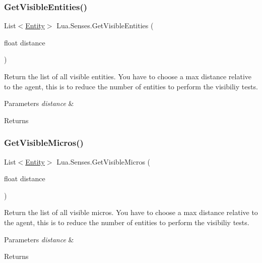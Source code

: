 \subsubsection{\texorpdfstring{GetVisibleEntities()}{GetVisibleEntities()}}
{\footnotesize\ttfamily List$<$\mbox{\hyperlink{class_lua_1_1_entity}{Entity}}$>$ Lua.\+Senses.\+Get\+Visible\+Entities (\begin{DoxyParamCaption}\item[{float}]{distance }\end{DoxyParamCaption})}



Return the list of all visible entities. You have to choose a max distance relative to the agent, this is to reduce the number of entities to perform the visibiliy tests. 


\begin{DoxyParams}{Parameters}
{\em distance} & \\
\hline
\end{DoxyParams}
\begin{DoxyReturn}{Returns}

\end{DoxyReturn}
\mbox{\label{class_lua_1_1_senses_a55e0ed7d6a4383d1f9e552b3be07bcee}} 
\subsubsection{\texorpdfstring{GetVisibleMicros()}{GetVisibleMicros()}}
{\footnotesize\ttfamily List$<$\mbox{\hyperlink{class_lua_1_1_entity}{Entity}}$>$ Lua.\+Senses.\+Get\+Visible\+Micros (\begin{DoxyParamCaption}\item[{float}]{distance }\end{DoxyParamCaption})}



Return the list of all visible micros. You have to choose a max distance relative to the agent, this is to reduce the number of entities to perform the visibiliy tests. 


\begin{DoxyParams}{Parameters}
{\em distance} & \\
\hline
\end{DoxyParams}
\begin{DoxyReturn}{Returns}

\end{DoxyReturn}


